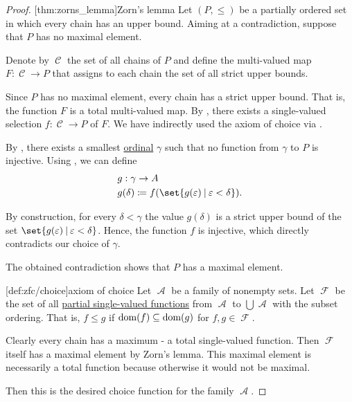 \begin{proof}
  [thm:zorns_lemma]{Zorn's lemma} Let \( (P, \leq) \) be a partially ordered set in which every chain has an upper bound. Aiming at a contradiction, suppose that \( P \) has no maximal element.

  Denote by \( \mscrC \) the set of all chains of \( P \) and define the multi-valued map \( F: \mscrC \to P \) that assigns to each chain the set of all strict upper bounds.

  Since \( P \) has no maximal element, every chain has a strict upper bound. That is, the function \( F \) is a total multi-valued map. By , there exists a single-valued selection \( f: \mscrC \to P \) of \( F \). We have indirectly used the axiom of choice via .

  By , there exists a smallest \hyperref[def:ordinal]{ordinal} \( \gamma \) such that no function from \( \gamma \) to \( P \) is injective. Using , we can define
  \begin{equation*}
    \begin{aligned}
      &g: \gamma \to A \\
      &g(\delta) \coloneqq f(\set{ g(\varepsilon) \given \varepsilon < \delta }).
    \end{aligned}
  \end{equation*}

  By construction, for every \( \delta < \gamma \) the value \( g(\delta) \) is a strict upper bound of the set \( \set{ g(\varepsilon) \given \varepsilon < \delta } \). Hence, the function \( f \) is injective, which directly contradicts our choice of \( \gamma \).

  The obtained contradiction shows that \( P \) has a maximal element.

  [def:zfc/choice]{axiom of choice} Let \( \mscrA \) be a family of nonempty sets. Let \( \mscrF \) be the set of all \hyperref[def:partial_function]{partial single-valued functions} from \( \mscrA \) to \( \bigcup \mscrA \) with the subset ordering. That is, \( f \leq g \) if \( \operatorname{dom}(f) \subseteq \operatorname{dom}(g) \) for \( f, g \in \mscrF \).

  Clearly every chain has a maximum - a total single-valued function. Then \( \mscrF \) itself has a maximal element by Zorn's lemma. This maximal element is necessarily a total function because otherwise it would not be maximal.

  Then this is the desired choice function for the family \( \mscrA \).
\end{proof}
